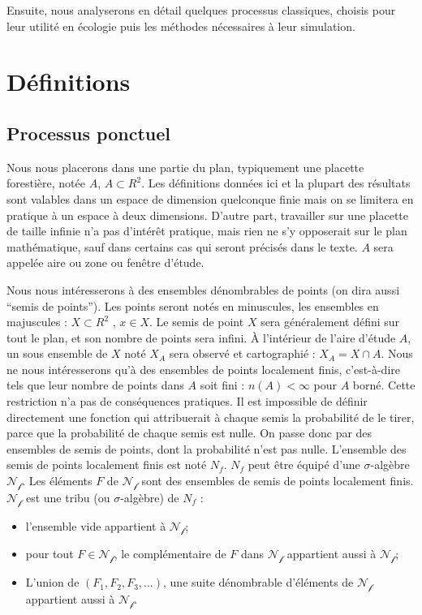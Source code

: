 \documentclass[
  11pt,
  french,
  A4paper,
  extrafontsizes,onecolumn,openright
  ]{memoir}
\theoremstyle{definition}
\theoremstyle{definition}
\theoremstyle{definition}
\theoremstyle{remark}
\begin{document}
Ensuite, nous analyserons en détail quelques processus classiques,
choisis pour leur utilité en écologie puis les méthodes nécessaires à
leur simulation.

\section{Définitions}\label{definitions}

\subsection{Processus ponctuel}\label{processus-ponctuel}

Nous nous placerons dans une partie du plan, typiquement une placette
forestière, notée \(A\), \(A \subset R^2\). Les définitions données ici
et la plupart des résultats sont valables dans un espace de dimension
quelconque finie mais on se limitera en pratique à un espace à deux
dimensions. D'autre part, travailler sur une placette de taille infinie
n'a pas d'intérêt pratique, mais rien ne s'y opposerait sur le plan
mathématique, sauf dans certains cas qui seront précisés dans le texte.
\(A\) sera appelée aire ou zone ou fenêtre d'étude.

Nous nous intéresserons à des ensembles dénombrables de points (on dira
aussi ``semis de points''). Les points seront notés en minuscules, les
ensembles en majuscules : \(X \subset R^2\) , \(x \in X\). Le semis de
point \(X\) sera généralement défini sur tout le plan, et son nombre de
points sera infini. À l'intérieur de l'aire d'étude \(A\), un sous
ensemble de \(X\) noté \(X_A\) sera observé et cartographié :
\(X_A = X \cap A\). Nous ne nous intéresserons qu'à des ensembles de
points localement finis, c'est-à-dire tels que leur nombre de points
dans \(A\) soit fini : \(n(A) < \infty\) pour \(A\) borné. Cette
restriction n'a pas de conséquences pratiques. Il est impossible de
définir directement une fonction qui attribuerait à chaque semis la
probabilité de le tirer, parce que la probabilité de chaque semis est
nulle. On passe donc par des ensembles de semis de points, dont la
probabilité n'est pas nulle. L'ensemble des semis de points localement
finis est noté \(N_f\). \(N_f\) peut être équipé d'une
\(\sigma\)-algèbre \(\mathcal{N_f}\). Les éléments \(F\) de
\(\mathcal{N_f}\) sont des ensembles de semis de points localement
finis. \(\mathcal{N_f}\) est une tribu (ou \(\sigma\)-algèbre) de
\(N_f\) :

\begin{itemize}
  \item l'ensemble vide appartient à $\mathcal{N_f}$;
  \item pour tout $F \in \mathcal{N_f}$, le complémentaire de $F$ dans $\mathcal{N_f}$ appartient aussi à $\mathcal{N_f}$;
  \item L’union de $(F_1, F_2, F_3,…)$, une suite dénombrable d'éléments de $\mathcal{N_f}$ appartient aussi à $\mathcal{N_f}$.
\end{itemize}
\end{document}
